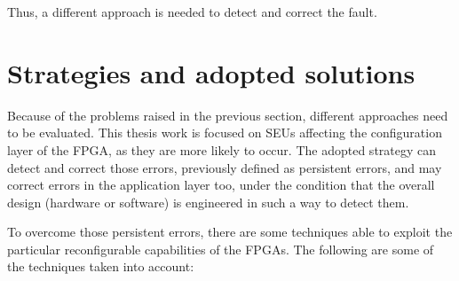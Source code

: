 Thus, a different approach is needed to detect and correct the fault.


\section{Strategies and adopted solutions}

Because of the problems raised in the previous section, different approaches need to be evaluated. This thesis work is focused on SEUs affecting the configuration layer of the FPGA, as they are more likely to occur. The adopted strategy can detect and correct those errors, previously defined as persistent errors, and may correct errors in the application layer too, under the condition that the overall design (hardware or software) is engineered in such a way to detect them. \bigskip

To overcome those persistent errors, there are some techniques able to exploit the particular reconfigurable capabilities of the FPGAs. The following are some of the techniques taken into account:

